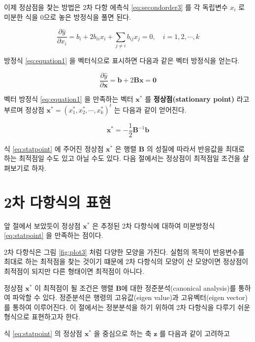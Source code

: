 \documentclass[
]{book}
\newcommand{\pardiff}[2]{\frac{\partial #1}{\partial #2 }}
\newcommand{\bm}[1]{\boldsymbol{\mathbf{#1}}}
\theoremstyle{definition}
\theoremstyle{definition}
\theoremstyle{definition}
\theoremstyle{definition}
\theoremstyle{remark}
\begin{document}
이제 정삼점을 찿는 방법은 2차 다항 에측식 \eqref{eq:secondorder3} 를 각 독립변수 \(x_i\) 로 미분한 식을 0으로 놓은
방정식을 풀면 된다.

\begin{equation}
\pardiff{\hat y}{x_i} =  b_i + 2 b_{ii} x_i + \sum_{j \ne i} b_{ij} x_j =0, \quad i=1,2,\cdots, k
\label{eq:equation1}
\end{equation}

방정식 \eqref{eq:equation1} 을 벡터식으로 표시하면 다음과 같은 벡터 방정식을 얻는다.

\begin{equation}
\pardiff{\hat y}{\bm x} =  \bm b + 2 {\bm B} \bm x = \bm 0
\label{eq:equation1}
\end{equation}

벡터 방정식 \eqref{eq:equation1} 을 만족하는 벡터 \({\bm x}^*\) 를 \textbf{정상점(stationary point)} 라고 부르며 정상점 \({\bm x}^* = (x_1^*, x_2^*, \cdots, x_k^*)^t\) 는 다음과 같이 얻어진다.

\begin{equation}
{\bm x}^* =  - \frac{1}{2} {\bm B}^{-1} \bm b
\label{eq:statpoint}
\end{equation}

식 \eqref{eq:statpoint} 에 주어진 정상점 \({\bm x}^*\) 은 행렬 \(\bm B\) 의 성질에 따라서 반응값을 최대로 하는 최적점일 수도 있고 아닐 수도 있다.
다음 절에서는 정상점이 최적점일 조건을 살펴보기로 하자.

\hypertarget{uxcc28-uxb2e4uxd56duxc2dduxc758-uxd45cuxd604}{%
\section{2차 다항식의 표현}\label{uxcc28-uxb2e4uxd56duxc2dduxc758-uxd45cuxd604}}

앞 절에서 보았듯이 정상점 \({\bm x}^*\) 은 추정된 2차 다항식에 대하여 미분방정식 \eqref{eq:statpoint} 을 만족하는 점이다.

2차 다항식은 그림 \ref{fig:plot3} 처럼 다양한 모양을 가진다. 실험의 목적이 반응변수를 최대로 하는 최적점을 찾는
것이기 떄문에 2차 다항식의 모양이 산 모양이면 정상점이 최적점이 되지만 다른 형태이면 최적점이 아니다.

정상점 \({\bm x}^*\) 이 최적점이 될 조건은 행렬 \(\bm B\)에 대한 정준분석(canonical analysis)를 통하여 파악할 수 있다. 정준분석은 행령의 고유값(eigen value)과 고유벡터(eigen vector) 를 통하여 이루어진다. 이 절에서는 정분분석을 하기 위하여 2차 다항식을 다루기 쉬운 형식으로 표현하고자 한다.

식 \eqref{eq:statpoint} 의 정상점 \({\bm x}^*\) 을 중심으로 하는 축 \(\bm z\) 를 다음과 같이 고려하고
\end{document}
